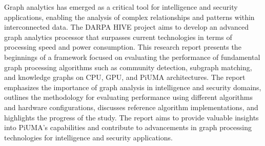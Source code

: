 \documentclass[letterpaper, 10pt]{article}
\begin{document}
\abstractname{}
\newline\par
\setlength{\parindent}{20pt}
Graph analytics has emerged as a critical tool for intelligence and security applications, enabling the analysis of complex relationships and patterns within interconnected data. The DARPA HIVE project aims to develop an advanced graph analytics processor that surpasses current technologies in terms of processing speed and power consumption. This research report presents the beginnings of a framework focused on evaluating the performance of fundamental graph processing algorithms such as community detection, subgraph matching, and knowledge graphs on CPU, GPU, and PiUMA architectures. The report emphasizes the importance of graph analysis in intelligence and security domains, outlines the methodology for evaluating performance using different algorithms and hardware configurations, discusses reference algorithm implementations, and highlights the progress of the study. The report aims to provide valuable insights into PiUMA's capabilities and contribute to advancements in graph processing technologies for intelligence and security applications.
\end{document}
